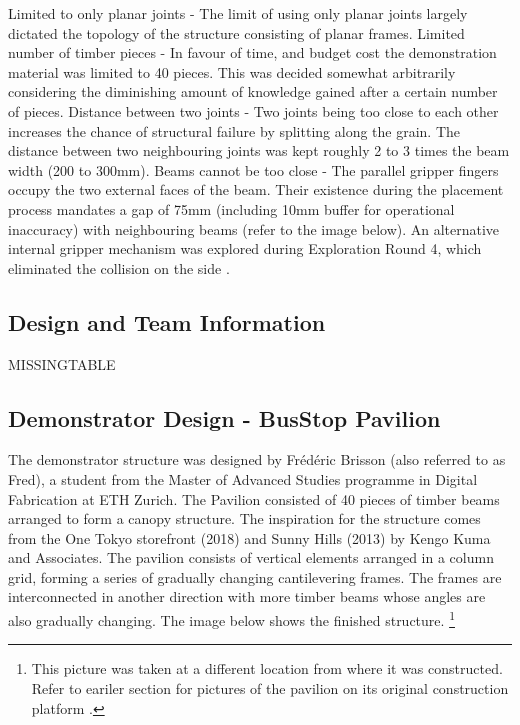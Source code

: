 Limited to only planar joints - The limit of using only planar joints largely dictated the topology of the structure consisting of planar frames. 
Limited number of timber pieces - In favour of time, and budget cost the demonstration material was limited to 40 pieces. This was decided somewhat arbitrarily considering the diminishing amount of knowledge gained after a certain number of pieces.
Distance between two joints - Two joints being too close to each other increases the chance of structural failure by splitting along the grain. The distance between two neighbouring joints was kept roughly 2 to 3 times the beam width (200 to 300mm).
Beams cannot be too close - The parallel gripper fingers occupy the two external faces of the beam. Their existence during the placement process mandates a gap of 75mm (including 10mm buffer for operational inaccuracy) with neighbouring beams (refer to the image below). An alternative internal gripper mechanism was explored during Exploration Round 4, which eliminated the collision on the side .

\subsection{Design and Team Information}
\label{subsection:exploration-2-design-and-team-information}

MISSINGTABLE

\subsection{Demonstrator Design - BusStop Pavilion}
\label{subsection:exploration-2-demonstrator-design-busstop-pavilion}

The demonstrator structure was designed by Frédéric Brisson (also referred to as Fred), a student from the Master of Advanced Studies programme in Digital Fabrication at ETH Zurich. The Pavilion consisted of 40 pieces of timber beams arranged to form a canopy structure. 
The inspiration for the structure comes from the One Tokyo storefront (2018) and Sunny Hills (2013) by Kengo Kuma and Associates. The pavilion consists of vertical elements arranged in a column grid, forming a series of gradually changing cantilevering frames. The frames are interconnected in another direction with more timber beams whose angles are also gradually changing.
The image below shows the finished structure. \footnote{This picture was taken at a different location from where it was constructed. Refer to eariler section for pictures of the pavilion on its original construction platform .}

